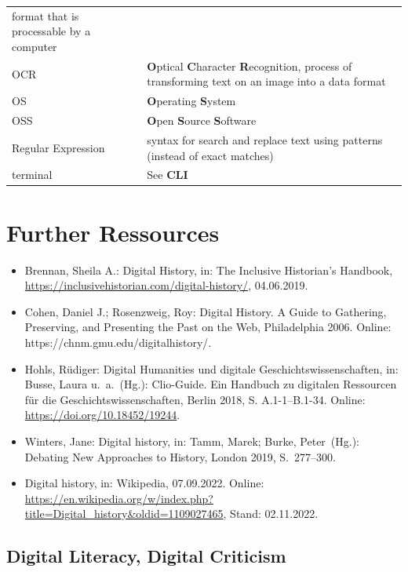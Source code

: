 \documentclass[
  letterpaper,
]{book}
\begin{document}
\begin{longtable}[]{@{}
  >{\raggedright\arraybackslash}p{}
  >{\raggedright\arraybackslash}p{}@{}}
format that is processable by a computer \\
OCR & \textbf{O}ptical \textbf{C}haracter \textbf{R}ecognition, process
of transforming text on an image into a data format \\
OS & \textbf{O}perating \textbf{S}ystem \\
OSS & \textbf{O}pen \textbf{S}ource \textbf{S}oftware \\
Regular Expression & syntax for search and replace text using patterns
(instead of exact matches) \\
terminal & See \textbf{CLI} \\
\bottomrule()
\end{longtable}

\hypertarget{further-ressources}{%
\chapter{Further Ressources}\label{further-ressources}}

\begin{itemize}
\item
  Brennan, Sheila A.: Digital History, in: The Inclusive Historian's
  Handbook, \url{https://inclusivehistorian.com/digital-history/},
  04.06.2019.
\item
  Cohen, Daniel J.; Rosenzweig, Roy: Digital History. A Guide to
  Gathering, Preserving, and Presenting the Past on the Web,
  Philadelphia 2006. Online: https://chnm.gmu.edu/digitalhistory/.
\item
  Hohls, Rüdiger: Digital Humanities und digitale
  Geschichtswissenschaften, in: Busse, Laura u.~a.~(Hg.): Clio-Guide.
  Ein Handbuch zu digitalen Ressourcen für die Geschichtswissenschaften,
  Berlin 2018, S. A.1-1--B.1-34. Online:
  \url{https://doi.org/10.18452/19244}.
\item
  Winters, Jane: Digital history, in: Tamm, Marek; Burke, Peter~(Hg.):
  Debating New Approaches to History, London 2019, S.~277--300.
\item
  Digital history, in: Wikipedia, 07.09.2022. Online:
  \url{https://en.wikipedia.org/w/index.php?title=Digital_history\&oldid=1109027465},
  Stand: 02.11.2022.
\end{itemize}

\hypertarget{digital-literacy-digital-criticism}{%
\section{Digital Literacy, Digital
Criticism}\label{digital-literacy-digital-criticism}}
\end{document}
